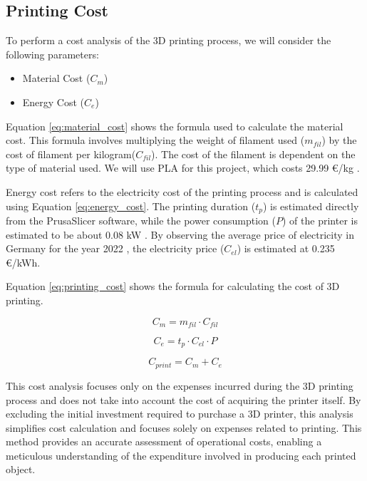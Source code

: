 \subsection{Printing Cost}
\label{subsec:printing_cost}

To perform a cost analysis of the 3D printing process, we will consider the following parameters:

\begin{itemize}
    \item Material Cost ($C_m$)
    \item Energy Cost ($C_e$)
\end{itemize}

Equation \ref{eq:material_cost} shows the formula used to calculate the material cost. This formula involves multiplying the weight of filament used ($m_{fil}$) by the cost of filament per kilogram($C_{fil}$). The cost of the filament is dependent on the type of material used. We will use PLA for this project, which costs 29.99 €/kg \cite{PrusaCost}.

Energy cost refers to the electricity cost of the printing process and is calculated using Equation \ref{eq:energy_cost}. The printing duration ($t_p$) is estimated directly from the PrusaSlicer software, while the power consumption ($P$) of the printer is estimated to be about 0.08 kW \cite{Prusa}. By observing the average price of electricity in Germany for the year 2022 \cite{NordPool}, the electricity price ($C_{el}$) is estimated at 0.235 €/kWh.

Equation \ref{eq:printing_cost} shows the formula for calculating the cost of 3D printing.

\begin{equation}
    \label{eq:material_cost}
    C_{m} = m_{fil}\cdot C_{fil}
\end{equation}

\begin{equation}
    \label{eq:energy_cost}
    C_{e} = t_{p}\cdot C_{el}\cdot P
\end{equation}

\begin{equation}
    \label{eq:printing_cost}
    C_{print} = C_{m} + C_{e}
\end{equation}


This cost analysis focuses only on the expenses incurred during the 3D printing process and does not take into account the cost of acquiring the printer itself. By excluding the initial investment required to purchase a 3D printer, this analysis simplifies cost calculation and focuses solely on expenses related to printing. This method provides an accurate assessment of operational costs, enabling a meticulous understanding of the expenditure involved in producing each printed object.


